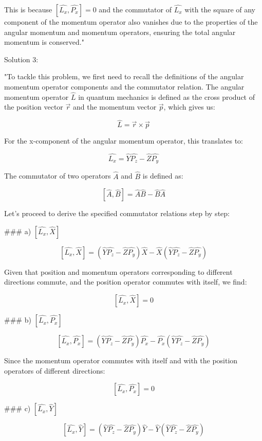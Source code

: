 This is because \( [ \hat{L_{x}}, \hat{P_{x}} ] = 0 \) and the commutator of \( \hat{L_{x}} \) with the square of any component of the momentum operator also vanishes due to the properties of the angular momentum and momentum operators, ensuring the total angular momentum is conserved."

Solution 3: 

"To tackle this problem, we first need to recall the definitions of the angular momentum operator components and the commutator relation. The angular momentum operator \( \hat{L} \) in quantum mechanics is defined as the cross product of the position vector \( \vec{r} \) and the momentum vector \( \vec{p} \), which gives us:

\[
\hat{L} = \vec{r} \times \vec{p}
\]

For the x-component of the angular momentum operator, this translates to:

\[
\hat{L_{x}} = \hat{Y}\hat{P_{z}} - \hat{Z}\hat{P_{y}}
\]

The commutator of two operators \( \hat{A} \) and \( \hat{B} \) is defined as:

\[
[\hat{A}, \hat{B}] = \hat{A}\hat{B} - \hat{B}\hat{A}
\]

Let's proceed to derive the specified commutator relations step by step:

### a) \( \left[ \hat{L_{x}}, \hat{X} \right] \)

\[
\left[ \hat{L_{x}}, \hat{X} \right] = (\hat{Y}\hat{P_{z}} - \hat{Z}\hat{P_{y}})\hat{X} - \hat{X}(\hat{Y}\hat{P_{z}} - \hat{Z}\hat{P_{y}})
\]

Given that position and momentum operators corresponding to different directions commute, and the position operator commutes with itself, we find:

\[
\left[ \hat{L_{x}}, \hat{X} \right] = 0
\]

### b) \( \left[ \hat{L_{x}}, \hat{P_{x}} \right] \)

\[
\left[ \hat{L_{x}}, \hat{P_{x}} \right] = (\hat{Y}\hat{P_{z}} - \hat{Z}\hat{P_{y}})\hat{P_{x}} - \hat{P_{x}}(\hat{Y}\hat{P_{z}} - \hat{Z}\hat{P_{y}})
\]

Since the momentum operator commutes with itself and with the position operators of different directions:

\[
\left[ \hat{L_{x}}, \hat{P_{x}} \right] = 0
\]

### c) \( \left[ \hat{L_{x}}, \hat{Y} \right] \)

\[
\left[ \hat{L_{x}}, \hat{Y} \right] = (\hat{Y}\hat{P_{z}} - \hat{Z}\hat{P_{y}})\hat{Y} - \hat{Y}(\hat{Y}\hat{P_{z}} - \hat{Z}\hat{P_{y}})
\]

